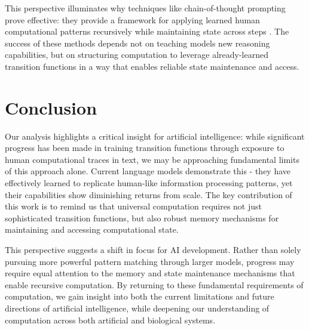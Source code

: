 \documentclass[12pt]{article}
\begin{document}
This perspective illuminates why techniques like chain-of-thought prompting prove effective: they provide a framework for applying learned human computational patterns recursively while maintaining state across steps \cite{wei2022chain}. The success of these methods depends not on teaching models new reasoning capabilities, but on structuring computation to leverage already-learned transition functions in a way that enables reliable state maintenance and access.

\section{Conclusion}

Our analysis highlights a critical insight for artificial intelligence: while significant progress has been made in training transition functions through exposure to human computational traces in text, we may be approaching fundamental limits of this approach alone. Current language models demonstrate this - they have effectively learned to replicate human-like information processing patterns, yet their capabilities show diminishing returns from scale. The key contribution of this work is to remind us that universal computation requires not just sophisticated transition functions, but also robust memory mechanisms for maintaining and accessing computational state.

This perspective suggests a shift in focus for AI development. Rather than solely pursuing more powerful pattern matching through larger models, progress may require equal attention to the memory and state maintenance mechanisms that enable recursive computation. By returning to these fundamental requirements of computation, we gain insight into both the current limitations and future directions of artificial intelligence, while deepening our understanding of computation across both artificial and biological systems.

\begingroup
\footnotesize


\endgroup
\end{document}

